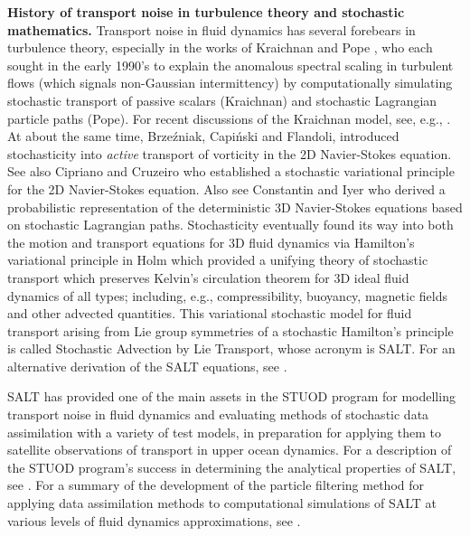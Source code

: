 \documentclass[11pt, oneside]{article}   	%
\numberwithin{equation}{section}
\theoremstyle{plain}
\theoremstyle{definition}
\theoremstyle{remark}
\newcommand{\<}{\langle}
\renewcommand{\>}{\rangle}
\begin{document}
{\bf  History of transport noise in turbulence theory and stochastic mathematics.}
Transport noise in fluid dynamics has several forebears in turbulence theory, especially in the works of Kraichnan \cite{kraichnan1994anomalous} and Pope \cite{pope1994lagrangi}, who each sought in the early 1990's to explain the anomalous spectral scaling  in turbulent flows (which signals non-Gaussian intermittency) by computationally simulating stochastic transport of passive scalars (Kraichnan) and stochastic Lagrangian particle paths (Pope). For recent discussions of the Kraichnan model, see, e.g., \cite{flandoli2023stochastic,gess2025stabilization}. At about the same time, Brze\'zniak, Capi\'nski and Flandoli, \cite{brzezniak1991stochastic,brzezniak1992stochastic} introduced stochasticity into \emph{active} transport of vorticity in the 2D Navier-Stokes equation. See also Cipriano and Cruzeiro \cite{cipriano2007navier} who established a stochastic variational principle for the 2D Navier-Stokes equation. Also see Constantin and Iyer \cite{constantin2008stochastic} who derived a probabilistic representation of the deterministic 3D Navier-Stokes equations based on stochastic Lagrangian paths. Stochasticity eventually found its way into both the motion and transport equations for 3D fluid dynamics via Hamilton's variational principle in Holm \cite{Holm2015} which provided a unifying theory of stochastic transport which preserves Kelvin's circulation theorem for 3D ideal fluid dynamics of all types; including, e.g., compressibility, buoyancy, magnetic fields and other advected quantities. This variational stochastic model for fluid transport arising from Lie group symmetries of a stochastic Hamilton's principle is called Stochastic Advection by Lie Transport, whose acronym is SALT. For an alternative derivation of the SALT equations, see \cite{cotter2017stochastic}.
 

SALT has provided one of the main assets in the STUOD program for modelling transport noise in fluid dynamics and evaluating methods of stochastic data assimilation with a variety of test models, in preparation for applying them to satellite observations of transport in upper ocean dynamics. For a description of the STUOD program's success in determining the analytical properties  of SALT, see \cite{crisan2022variational,crisan2022solution,CrFlHo2019}. For a summary of the development of the particle filtering method for applying data assimilation methods to computational simulations of SALT at various levels of fluid dynamics approximations, 
see \cite{cotter2018modelling,CCHOS18a,CCHOS18b,cotter2019particle,cotter2019numerically}.
\end{document}
